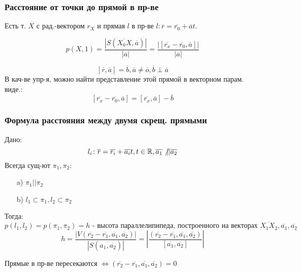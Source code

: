 \subsubsection{Расстояние от точки до прямой в пр-ве}
\begin{task}
Есть т. $X$ с рад.-вектором $r_X$ и прямая $l$ в пр-ве $l \colon \overline{r} = \overline{r_0} + \overline{a}t$.
\end{task}
\begin{solution}
\[
  p(X, 1) = \frac{\left|S(\overline{X_0X}, \overline{a})\right|}{\left|\overline{a}\right|} = \frac{\left|[\overline{r_x} - \overline{r_0}, \overline{a}]\right|}{\left|\overline{a}\right|}
\]
\end{solution}
\begin{example}
\[
[\overline{r}, \overline{a}] = \overline{b}, \overline{a} \neq \overline{o}, \overline{b} \perp \overline{a}
\]
В кач-ве упр-я, можно найти представление этой прямой в векторном парам. виде.:
\[
[\overline{r_x} - \overline{r_0}, \overline{a}] = [\overline{r_x}, \overline{a}] - \overline{b}
\]
\end{example}
\subsubsection{Формула расстояния между двумя скрещ. прямыми}
\begin{task}
Дано:
\[
l_i \colon \overline{r} = \overline{r_i} + \overline{a_i}t, t \in \mathbb{R}, \overline{a_1} \not|| \overline{a_2}
\]
Всегда сущ-ют $\pi_1, \pi_2 \colon$
\begin{itemize}
  \item [a) ] $\pi_1 || \pi_2$
  \item [b) ] $l_1 \subset \pi_1, l_2 \subset \pi_2$
\end{itemize}
Тогда:
\[
p(l_1, l_2) = p(\pi_1, \pi_2) = h \text{ - высота параллелипипеда, построенного на векторах $\overline{X_1X_2}, \overline{a_1}, \overline{a_2}$}
\]
\[
h = \frac{\left|V(\overline{r_2} - \overline{r_1}, \overline{a_1}, \overline{a_2})\right|}{\left|S(\overline{a_1, \overline{a_2}})\right|} = \left|\frac{(\overline{r_2} - \overline{r_1}, \overline{a_1}, \overline{a_2})}{[\overline{a_1}, \overline{a_2}]}\right|
\]
\end{task}
\begin{note}
Прямые в пр-ве пересекаются $\iff (\overline{r_2} - \overline{r_1}, \overline{a_1}, \overline{a_2}) = 0$
\end{note}
